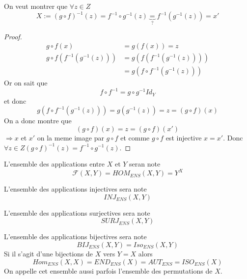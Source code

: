 \documentclass[../main.tex]{subfiles}
\begin{document}
\begin{propo}\label{propo:inverse_d_une_composition}
On veut montrer que $\forall z \in Z$ 
\[ 
	X := ( g\circ f)^{-1} ( z) = f^{-1} \circ g^{-1} ( z) \underbrace{=}_{?} f^{-1} ( g^{-1}(z)) = x'
\]

\end{propo}
\begin{proof}
\begin{align*}
	g \circ f ( x) &= g(f(x)) = z\\
	g\circ f( f^{-1}(g^{-1}(z))) &= g(f(f^{-1}(g^{-1}(z))))\\
				     &= g( f\circ f^{-1}(g^{-1}(z)))
\end{align*}
Or on sait que
\[ 
	f \circ f^{-1} = g \circ g^{-1} Id_{Y}
\]
et donc
\[ 
	g(f\circ f^{-1}(g^{-1}(z))) = g(g^{-1}(z)) =z = ( g \circ f)(x) 
\]
On a donc montre que
\[ 
	(g \circ f)(x) = z = ( g\circ f)(x')
\]
$\Rightarrow x$ et $x'$ on la meme image par $g\circ f $ et comme $g\circ f$ est injective $x=x'$.
Donc $\forall z \in Z (g\circ f)^{-1}(z) = f^{-1}\circ g^{-1}(z)$.

\end{proof}
L'ensemble des applications entre $X$ et $Y$ seran note
\[ 
	\mathcal{F} ( X,Y) = HOM_{ENS}(X,Y) = Y^{X}
\]
\begin{defn}\label{def:notations_injection}
L'ensemble des applications injectives sera note
\[ 
	INJ_{ENS}(X,Y)
\]

\end{defn}


\begin{defn}\label{def:notations_injection}
L'ensemble des applications surjectives sera note
\[ 
	SURJ_{ENS}(X,Y)
\]

\end{defn}

\begin{defn}\label{def:notations_injection}
L'ensemble des applications bijectives sera note
\[ 
	BIJ_{ENS}(X,Y) = Iso_{ENS}(X,Y)		
\]
Si il s'agit d'une bijections de $X$ vers $Y=X$ alors
\[ 
	Hom_{ENS}(X,X) = END_{ENS}(X) = AUT_{ENS} = ISO_{ENS}(X)
\]
On appelle cet ensemble aussi parfois l'ensemble des permutations de $X$.

\end{defn}
\end{document}
